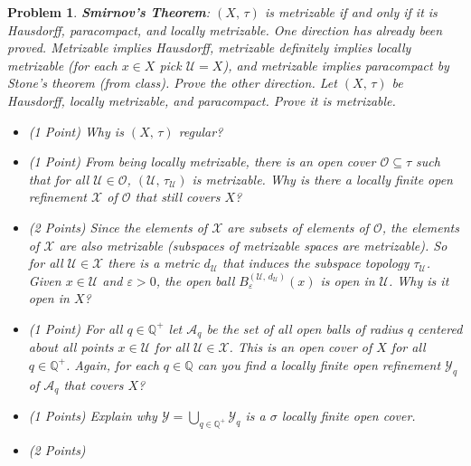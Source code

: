 \documentclass{article}
\theoremstyle{normal}
\newtheorem{problem}{Problem}
\begin{document}
\begin{problem}
        \textbf{Smirnov's Theorem}: $(X,\,\tau)$ is metrizable if and only if
        it is Hausdorff, paracompact, and locally metrizable. One direction has
        already been proved. Metrizable implies Hausdorff, metrizable definitely
        implies locally metrizable (for each $x\in{X}$ pick $\mathcal{U}=X$),
        and metrizable implies paracompact by Stone's theorem (from class).
        Prove the other direction. Let $(X,\,\tau)$ be Hausdorff, locally
        metrizable, and paracompact. Prove it is metrizable.
        \begin{itemize}
            \item (1 Point) Why is $(X,\,\tau)$ regular?
            \item (1 Point) From being locally metrizable, there is an open
                cover $\mathcal{O}\subseteq\tau$ such that for all
                $\mathcal{U}\in\mathcal{O}$,
                $(\mathcal{U},\,\tau_{\mathcal{U}})$ is metrizable. Why is there
                a locally finite open refinement $\mathcal{X}$ of $\mathcal{O}$
                that still covers $X$?
            \item (2 Points)
                Since the elements of $\mathcal{X}$ are subsets of elements
                of $\mathcal{O}$, the elements of $\mathcal{X}$ are also
                metrizable (subspaces of metrizable spaces are metrizable).
                So for all $\mathcal{U}\in\mathcal{X}$ there is a metric
                $d_{\mathcal{U}}$ that induces the subspace topology
                $\tau_{\mathcal{U}}$. Given $x\in\mathcal{U}$ and
                $\varepsilon>0$, the open ball
                $B_{\varepsilon}^{(\mathcal{U},\,d_{\mathcal{U}})}(x)$ is
                open in $\mathcal{U}$. Why is it open in $X$?
            \item (1 Point)
                For all $q\in\mathbb{Q}^{+}$ let $\mathcal{A}_{q}$ be the set
                of all open balls of radius $q$ centered about all points
                $x\in\mathcal{U}$ for all $\mathcal{U}\in\mathcal{X}$. This is
                an open cover of $X$ for all $q\in\mathbb{Q}^{+}$. Again, for
                each $q\in\mathbb{Q}$ can you find a locally finite open
                refinement $\mathcal{Y}_{q}$ of $\mathcal{A}_{q}$ that covers
                $X$?
            \item (1 Points)
                Explain why $\mathcal{Y}=\bigcup_{q\in\mathbb{Q}^{+}}\mathcal{Y}_{q}$
                is a $\sigma$ locally finite open cover.
            \item (2 Points)

\end{itemize}
\end{problem}
\end{document}
